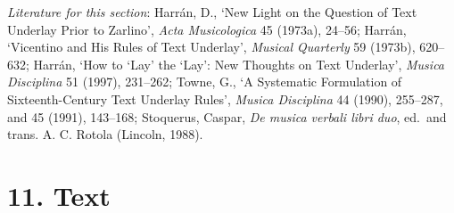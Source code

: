 \emph{Literature for this section}: Harrán, D., `New Light on the Question of Text Underlay Prior to Zarlino', \emph{Acta Musicologica} 45 (1973a), 24--56; Harrán, `Vicentino and His Rules of Text Underlay', \emph{Musical Quarterly} 59 (1973b), 620--632; Harrán, `How to ‘Lay’ the ‘Lay’: New Thoughts on Text Underlay', \emph{Musica Disciplina} 51 (1997), 231--262; Towne, G., `A Systematic Formulation of Sixteenth-Century Text Underlay Rules', \emph{Musica Disciplina} 44 (1990), 255--287, and 45 (1991), 143--168; Stoquerus, Caspar, \emph{De musica verbali libri duo}, ed.~and trans. A. C. Rotola (Lincoln, 1988).

\section*{11. Text}

